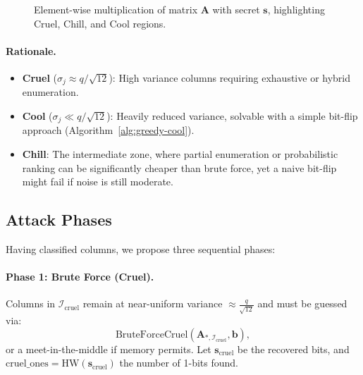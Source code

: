 \documentclass[11pt]{article}
\begin{document}
\begin{figure}[ht]
  \caption{Element-wise multiplication of matrix $\mathbf{A}$ with secret $\mathbf{s}$, highlighting Cruel, Chill, and Cool regions.}
  \label{fig:rlwe_matrix_elementwise}
\end{figure}


\paragraph{Rationale.}
\begin{itemize}
  \item \textbf{Cruel} ($\sigma_j \approx q/\sqrt{12}$): High variance columns requiring exhaustive or hybrid enumeration.
  \item \textbf{Cool} ($\sigma_j \ll q/\sqrt{12}$): Heavily reduced variance, solvable with a simple bit-flip approach (Algorithm~\ref{alg:greedy-cool}).
  \item \textbf{Chill}: The intermediate zone, where partial enumeration or probabilistic ranking can be significantly cheaper than brute force, yet a naive bit-flip might fail if noise is still moderate.
\end{itemize}


\subsection{Attack Phases}
\label{subsec:attack-phases}

Having classified columns, we propose three sequential phases:

\paragraph{Phase 1: Brute Force (Cruel).}
Columns in $\mathcal{I}_{\mathrm{cruel}}$ remain at near-uniform variance $\approx \frac{q}{\sqrt{12}}$ and must be guessed via:
\[
  \mathrm{BruteForceCruel}(\mathbf{A}_{*, \mathcal{I}_{\mathrm{cruel}}}, \mathbf{b}), 
\]
or a meet-in-the-middle if memory permits. Let $\mathbf{s}_{\mathrm{cruel}}$ be the recovered bits, and $\mathrm{cruel\_ones} = \mathrm{HW}(\mathbf{s}_{\mathrm{cruel}})$ the number of 1-bits found.
\end{document}
